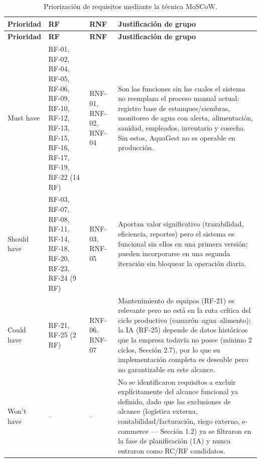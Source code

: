 \documentclass[11pt,a4paper]{article}
\begin{document}
\begin{longtable}{|p{2.2cm}|p{3.6cm}|p{3.5cm}|p{5.8cm}|}
\caption{Priorización de requisitos mediante la técnica MoSCoW.}
\label{tab:priorizacion-moscow} \\
\hline
\textbf{Prioridad} & \textbf{RF} & \textbf{RNF} & \textbf{Justificación de grupo} \\
\hline
\endfirsthead

\hline
\textbf{Prioridad} & \textbf{RF} & \textbf{RNF} & \textbf{Justificación de grupo} \\
\hline
\endhead

\hline
\endfoot

\hline
\endlastfoot

Must have &
RF-01, RF-02, RF-04, RF-05, RF-06, RF-09, RF-10, RF-12, RF-13, RF-15, RF-16, RF-17, RF-19, RF-22 (14 RF) &
RNF-01, RNF-02, RNF-04 &
Son las funciones sin las cuales el sistema no reemplaza el proceso manual actual: registro base de estanques/siembras, monitoreo de agua con alerta, alimentación, sanidad, empleados, inventario y cosecha. Sin estos, AquaGest no es operable en producción. \\
\hline

Should have &
RF-03, RF-07, RF-08, RF-11, RF-14, RF-18, RF-20, RF-23, RF-24 (9 RF) &
RNF-03, RNF-05 &
Aportan valor significativo (trazabilidad, eficiencia, reportes) pero el sistema es funcional sin ellos en una primera versión; pueden incorporarse en una segunda iteración sin bloquear la operación diaria. \\
\hline

Could have &
RF-21, RF-25 (2 RF) &
RNF-06, RNF-07 &
Mantenimiento de equipos (RF-21) es relevante pero no está en la ruta crítica del ciclo productivo (camarón–agua–alimento); la IA (RF-25) depende de datos históricos que la empresa todavía no posee (mínimo 2 ciclos, Sección 2.7), por lo que su implementación completa es deseable pero no garantizable en este alcance. \\
\hline

Won't have &
-- &
-- &
No se identificaron requisitos a excluir explícitamente del alcance funcional ya definido, dado que las exclusiones de alcance (logística externa, contabilidad/facturación, riego externo, e-commerce — Sección 1.2) ya se filtraron en la fase de planificación (1A) y nunca entraron como RC/RF candidatos. \\
\hline

\end{longtable}
\end{document}
